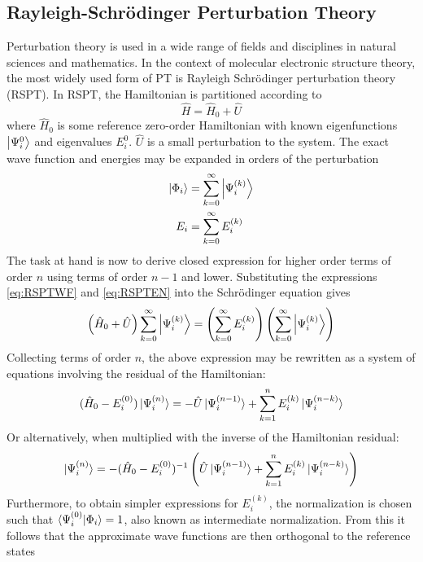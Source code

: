 \subsection{Rayleigh-Schrödinger Perturbation Theory}

Perturbation theory is used in a wide range of fields and disciplines in natural sciences and mathematics. In the context of molecular electronic structure theory, the most widely used form of PT is Rayleigh Schrödinger perturbation theory (RSPT). In RSPT, the Hamiltonian is partitioned according to
\begin{equation}
\hat{H} = \hat{H}_0 + \hat{U}
\end{equation}
\noindent where $\hat{H}_0$ is some reference zero-order Hamiltonian with known eigenfunctions $\ket{\Psi^{0}_i}$ and eigenvalues $E_i^{0}$. $\hat{U}$ is a small perturbation to the system. The exact wave function and energies may be expanded in orders of the perturbation
\begin{align}
\ket{\Phi_i} &= \sum_{k=0}^{\infty} \ket{\Psi_i^{(k)}} \label{eq:RSPTWF} \\
E_i &= \sum_{k=0}^{\infty} E_i^{(k)} \label{eq:RSPTEN}
\end{align} 
\noindent The task at hand is now to derive closed expression for higher order terms of order $n$ using terms of order $n-1$ and lower. Substituting the expressions \ref{eq:RSPTWF} and \ref{eq:RSPTEN} into the Schrödinger equation gives
\begin{equation}
\left(\hat{H}_0 + \hat{U}\right) \sum_{k=0}^{\infty} \ket{\Psi_i^{(k)}} = \left( \sum_{k=0}^{\infty} E_i^{(k)} \right) \left( \sum_{k=0}^{\infty} \ket{\Psi_i^{(k)}} \right)
\label{eq:RSPTSEQ}
\end{equation}
\noindent Collecting terms of order $n$, the above expression may be rewritten as a system of equations involving the residual of the Hamiltonian:
\begin{equation}
(\hat{H}_0 - E_i^{(0)}) \ket{\smash{\Psi_i^{(n)}}} = -\hat{U} \ket{\smash{\Psi_i^{(n-1)}}} + \sum_{k=1}^{n} E_i^{(k)} \ket{\smash{\Psi_i^{(n-k)}}}
\label{eq:RSPTSEQ2}
\end{equation}
\noindent Or alternatively, when multiplied with the inverse of the Hamiltonian residual:
\begin{equation}
 \ket{\smash{\Psi_i^{(n)}}} = - (\hat{H}_0 - E_i^{(0)})^{-1} \left( \hat{U} \ket{\smash{\Psi_i^{(n-1)}}} + \sum_{k=1}^{n} E_i^{(k)} \ket{\smash{\Psi_i^{(n-k)}}} \right)
\label{eq:RSPTSWF}
\end{equation}
\noindent Furthermore, to obtain simpler expressions for $E_i^{(k)}$, the normalization is chosen such that $\bra{\smash{\Psi_i^{(0)}}}\ket{\smash{\Phi_i}}=1$, also known as intermediate normalization. From this it follows that the approximate wave functions are then orthogonal to the reference states
